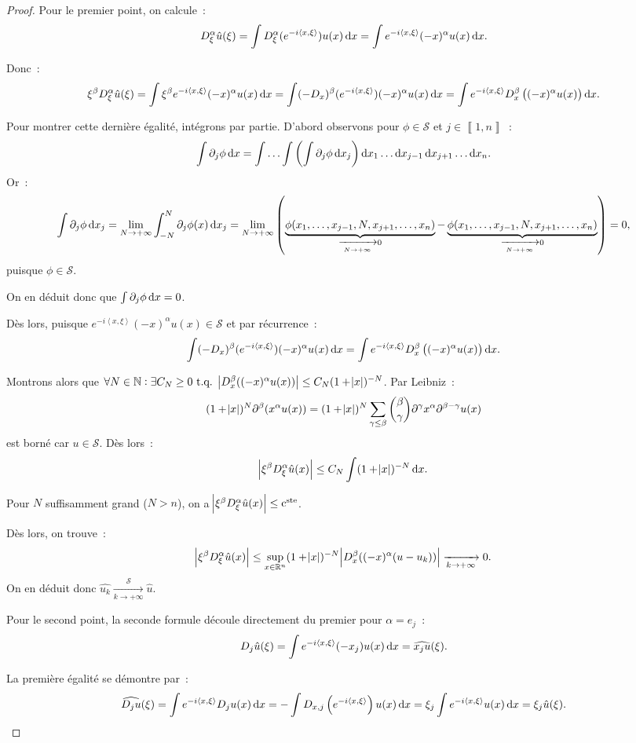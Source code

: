 \documentclass{report}
\newcommand{\R}{{\mathbb R}}
\newcommand{\N}{{\mathbb N}}
\newcommand{\scpr}[2]{\left\langle#1, #2\right\rangle}
\newcommand{\tq}{\text{ t.q. }}
\newcommand{\pinfty}{{+\infty}}
\newcommand{\intint}[2]{\left\llbracket#1, #2\right\rrbracket}
\newcommand{\cste}{\text{c}^{\text{ste}}}
\newcommand{\dx}{\dif x}
\theoremstyle{definition}
\theoremstyle{remark}
\begin{document}
\begin{proof} Pour le premier point, on calcule~:
\[D^\alpha_\xi\hat u(\xi) = \int D^\alpha_\xi(e^{-i\scpr x\xi})u(x)\dif x = \int e^{-i\scpr x\xi}(-x)^\alpha u(x)\dif x.\]

Donc~:
\[\xi^\beta D^\alpha_\xi\hat u(\xi) = \int \xi^\beta e^{-i\scpr x\xi}(-x)^\alpha u(x)\dif x = \int (-D_x)^\beta(e^{-i\scpr x\xi})(-x)^\alpha u(x)\dif x
	= \int e^{-i\scpr x\xi} D^\beta_x\left((-x)^\alpha u(x)\right)\dif x.\]

Pour montrer cette dernière égalité, intégrons par partie. D'abord observons pour $\phi \in \mathcal S$ et $j \in \intint 1n$~:
\[\int \partial_j\phi\dx = \int\ldots\int\left(\int \partial_j\phi\dx_j\right)\dx_1\ldots\dx_{j-1}\dx_{j+1}\ldots\dx_n.\]
Or~:
\[\int \partial_j\phi\dx_j = \lim_{N \to \pinfty}\int_{-N}^N\partial_j\phi(x)\dx_j
	= \lim_{N \to \pinfty}\left(\underbrace {\phi(x_1, \ldots, x_{j-1}, N, x_{j+1}, \ldots, x_n)}_{\xrightarrow[N \to \pinfty]{} 0} - \underbrace {\phi(x_1, \ldots, x_{j-1}, N, x_{j+1}, \ldots, x_n)}_{\xrightarrow[N \to \pinfty]{} 0}\right) = 0,\]
puisque $\phi \in \mathcal S$.

On en déduit donc que $\int\partial_j\phi\dx = 0$.

Dès lors, puisque $e^{-i\scpr x\xi}(-x)^\alpha u(x) \in \mathcal S$ et par récurrence~:
\[\int (-D_x)^\beta(e^{-i\scpr x\xi})(-x)^\alpha u(x)\dif x	= \int e^{-i\scpr x\xi} D^\beta_x\left((-x)^\alpha u(x)\right)\dif x.\]

Montrons alors que $\forall N \in \N : \exists C_N \geq 0 \tq \abs {D_x^\beta((-x)^\alpha u(x))} \leq C_N(1 + \abs x)^{-N}$. Par Leibniz~:
\[(1 + \abs x)^N\partial^\beta (x^\alpha u(x)) = (1 + \abs x)^N\sum_{\gamma \leq \beta} \binom \beta\gamma\partial^\gamma x^\alpha\partial^{\beta-\gamma}u(x)\]
est borné car $u \in \mathcal S$. Dès lors~:
\[\abs {\xi^\beta D_\xi^\alpha \hat u(x)} \leq C_N\int(1 + \abs x)^{-N}\dx.\]

Pour $N$ suffisamment grand ($N > n$), on a $\abs {\xi^\beta D_\xi^\alpha \hat u(x)} \leq \cste$.

Dès lors, on trouve~:
\[\abs {\xi^\beta D_\xi^\alpha\hat u(x)} \leq \sup_{x \in \R^n}(1 + \abs x)^{-N}\abs {D_x^\beta((-x)^\alpha(u - u_k))} \xrightarrow[k \to \pinfty]{} 0.\]
On en déduit donc $\hat {u_k} \xrightarrow[k \to \pinfty]{\mathcal S} \hat u$.

Pour le second point, la seconde formule découle directement du premier pour $\alpha = e_j$~:
\[D_j\hat u(\xi) = \int e^{-i\scpr x\xi}(-x_j)u(x)\dx = \widehat {x_ju}(\xi).\]

La première égalité se démontre par~:
\[\widehat {D_ju}(\xi) = \int e^{-i\scpr x\xi} D_ju(x)\dx = -\int D_{x,j}\left(e^{-i\scpr x\xi}\right)u(x)\dx = \xi_j\int e^{-i\scpr x\xi}u(x)\dx = \xi_j\hat u(\xi).\]
\end{proof}
\end{document}
